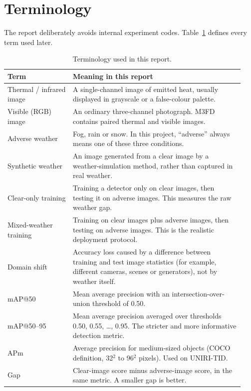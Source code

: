 \documentclass[11pt,a4paper]{article}
\begin{document}
\section{Terminology}

The report deliberately avoids internal experiment codes. Table~\ref{tab:terms}
defines every term used later.

\begin{table}[H]
\centering
\small
\caption{Terminology used in this report.}
\label{tab:terms}
\begin{tabular}{@{}p{0.26\linewidth}p{0.68\linewidth}@{}}
\toprule
Term & Meaning in this report \\
\midrule
Thermal / infrared image & A single-channel image of emitted heat, usually displayed in grayscale or a false-colour palette. \\
Visible (RGB) image & An ordinary three-channel photograph. M3FD contains paired thermal and visible images. \\
Adverse weather & Fog, rain or snow. In this project, ``adverse'' always means one of these three conditions. \\
Synthetic weather & An image generated from a clear image by a weather-simulation method, rather than captured in real weather. \\
Clear-only training & Training a detector only on clear images, then testing it on adverse images. This measures the raw weather gap. \\
Mixed-weather training & Training on clear images plus adverse images, then testing on adverse images. This is the realistic deployment protocol. \\
Domain shift & Accuracy loss caused by a difference between training and test image statistics (for example, different cameras, scenes or generators), not by weather itself. \\
mAP@50 & Mean average precision with an intersection-over-union threshold of 0.50. \\
mAP@50--95 & Mean average precision averaged over thresholds 0.50, 0.55, \ldots, 0.95. The stricter and more informative detection metric. \\
APm & Average precision for medium-sized objects (COCO definition, 32$^2$ to 96$^2$ pixels). Used on UNIRI-TID. \\
Gap & Clear-image score minus adverse-image score, in the same metric. A smaller gap is better. \\

\end{tabular}
\end{table}
\end{document}
